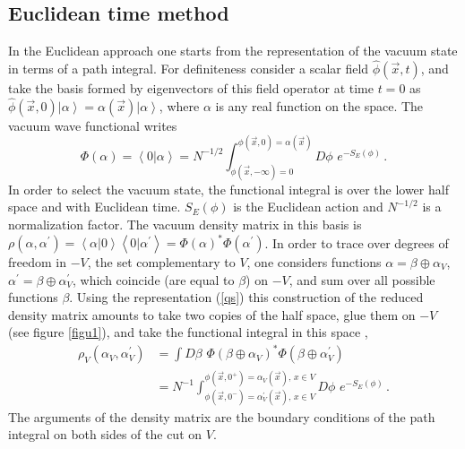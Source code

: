 \documentclass[11pt]{article}
\begin{document}
\subsection{Euclidean time method}
In the Euclidean approach one starts from the representation of the vacuum state in terms of a path integral.  For definiteness consider a scalar field $\hat{\phi}(\vec{x},t)$, and take the basis formed by eigenvectors of this field operator at time $t=0$ as $\hat{\phi} (\vec{x},0) \left|  \alpha\right>= \alpha(\vec{x})\left|  \alpha\right>$, where $\alpha$ is any real function on the space. The vacuum wave functional writes \cite{book}  
\begin{equation}
\Phi(\alpha)=\left<0|\alpha\right>=N^{-1/2}\int_{\phi(\vec{x},-\infty)= 0}^{\phi(\vec{x},0)=\alpha(\vec{x})} D\phi\,\, e^{-S_E(\phi)}\,. \label{qs}
\end{equation} 
In order to select the vacuum state, the functional integral is over the lower half space and with Euclidean time. $S_E(\phi)$ is the Euclidean action and $N^{-1/2}$ is a normalization factor. The vacuum density matrix in this basis is
$\rho(\alpha,\alpha^\prime)=\left<\alpha | 0\right> \left< 0| \alpha^\prime\right>=\Phi(\alpha)^*\Phi(\alpha^\prime)$. In order to trace over degrees of freedom in $-V$, the set complementary to $V$, one considers functions $\alpha=\beta \oplus \alpha_{V}$, $\alpha^\prime=\beta\oplus \alpha^\prime_{V}$, which coincide (are equal to $\beta$) on $-V$, and sum over all possible functions $\beta$. Using the representation (\ref{qs}) this construction of the reduced density matrix amounts to take two copies of the half space, glue them on $-V$ (see figure \ref{figu1}), and take the functional integral in this space \cite{ci},
\begin{align}
\rho_V(\alpha_{V},\alpha^\prime_{V})&=\int D\beta\,\, \Phi(\beta \oplus \alpha_{V})^* \Phi(\beta\oplus \alpha^\prime_{V})\nonumber\\ 
&= N^{-1}\int_{\phi(\vec{x},0^-)=\alpha^\prime_V(\vec{x}),\, x\in V }^{\phi(\vec{x},0^+)=\alpha_V(\vec{x}),\,x\in V} D\phi\,\, e^{-S_E(\phi)}\,. \label{opre}
\end{align}
The arguments of the density matrix are the boundary conditions of the path integral on both sides of the cut on $V$. 
\end{document}
